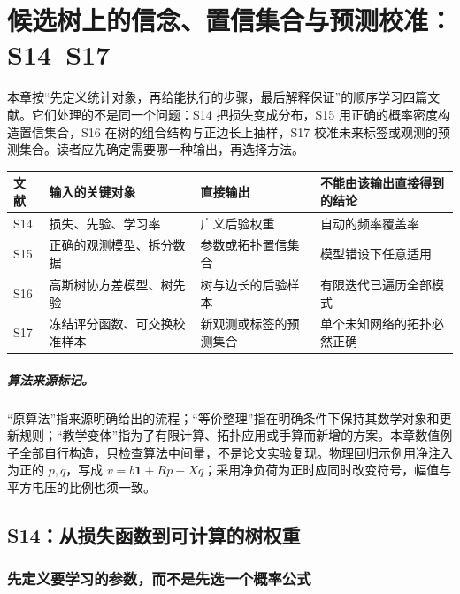 \documentclass[UTF8,11pt,fontset=fandol,openany,oneside]{ctexbook}
\theoremstyle{definition}
\theoremstyle{remark}
\numberwithin{equation}{chapter}
\begin{document}


\chapter{候选树上的信念、置信集合与预测校准：S14--S17}
\label{chap:statistical-textbook}

本章按“先定义统计对象，再给能执行的步骤，最后解释保证”的顺序学习四篇文献。它们处理的不是同一个问题：S14 把损失变成分布，S15 用正确的概率密度构造置信集合，S16 在树的组合结构与正边长上抽样，S17 校准未来标签或观测的预测集合。读者应先确定需要哪一种输出，再选择方法。

\begin{center}
\begin{tabularx}{\linewidth}{lXXX}
\toprule
文献 & 输入的关键对象 & 直接输出 & 不能由该输出直接得到的结论\\
\midrule
S14 & 损失、先验、学习率 & 广义后验权重 & 自动的频率覆盖率\\
S15 & 正确的观测模型、拆分数据 & 参数或拓扑置信集合 & 模型错设下任意适用\\
S16 & 高斯树协方差模型、树先验 & 树与边长的后验样本 & 有限迭代已遍历全部模式\\
S17 & 冻结评分函数、可交换校准样本 & 新观测或标签的预测集合 & 单个未知网络的拓扑必然正确\\
\bottomrule
\end{tabularx}
\end{center}

\paragraph{算法来源标记。}
“原算法”指来源明确给出的流程；“等价整理”指在明确条件下保持其数学对象和更新规则；“教学变体”指为了有限计算、拓扑应用或手算而新增的方案。本章数值例子全部自行构造，只检查算法中间量，不是论文实验复现。物理回归示例用净注入为正的 $p,q$，写成 $v=b\mathbf1+Rp+Xq$；采用净负荷为正时应同时改变符号，幅值与平方电压的比例也须一致。

\section{S14：从损失函数到可计算的树权重}
\label{sec:textbook-S14}

\subsection{先定义要学习的参数，而不是先选一个概率公式}
\end{document}
